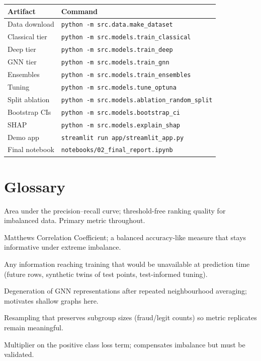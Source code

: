 \documentclass[11pt,a4paper]{article}
\newcommand{\code}[1]{\texttt{\small #1}}
\begin{document}
\begin{table}[h]
      \centering\small
      \begin{tabularx}{\textwidth}{lX}
            \toprule
            Artifact & Command\\
            \midrule
            Data download & \code{python -m src.data.make\_dataset}\\
            Classical tier & \code{python -m src.models.train\_classical}\\
            Deep tier & \code{python -m src.models.train\_deep}\\
            GNN tier & \code{python -m src.models.train\_gnn}\\
            Ensembles & \code{python -m src.models.train\_ensembles}\\
            Tuning & \code{python -m src.models.tune\_optuna}\\
            Split ablation & \code{python -m src.models.ablation\_random\_split}\\
            Bootstrap CIs & \code{python -m src.models.bootstrap\_ci}\\
            SHAP & \code{python -m src.models.explain\_shap}\\
            Demo app & \code{streamlit run app/streamlit\_app.py}\\
            Final notebook & \code{notebooks/02\_final\_report.ipynb}\\
            \bottomrule
      \end{tabularx}
\end{table}

\section{Glossary}
\begin{description}[leftmargin=1.4em, style=nextline]
      \item[PR-AUC] Area under the precision--recall curve; threshold-free ranking quality for
            imbalanced data. Primary metric throughout.
      \item[MCC] Matthews Correlation Coefficient; a balanced accuracy-like measure that stays
            informative under extreme imbalance.
      \item[Leakage] Any information reaching training that would be unavailable at prediction
            time (future rows, synthetic twins of test points, test-informed tuning).
      \item[Over-smoothing] Degeneration of GNN representations after repeated neighbourhood
            averaging; motivates shallow graphs here.
      \item[stratified bootstrap] Resampling that preserves subgroup sizes (fraud/legit counts)
            so metric replicates remain meaningful.
      \item[pos\_weight / scale\_pos\_weight] Multiplier on the positive class loss term;
            compensates imbalance but must be validated.
\end{description}
\end{document}
